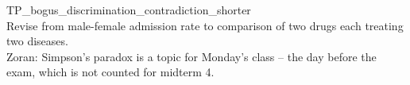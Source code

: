 \documentclass[quiz]{mcs}
\begin{document}
\begin{staffnotes}
TP\_bogus\_discrimination\_contradiction\_shorter\\
Revise from male-female admission rate to comparison of
two drugs each treating two diseases.\\
Zoran: Simpson's paradox is a topic for Monday's class
-- the day before the exam, which is not counted for midterm 4.
\end{staffnotes}





\end{document}
